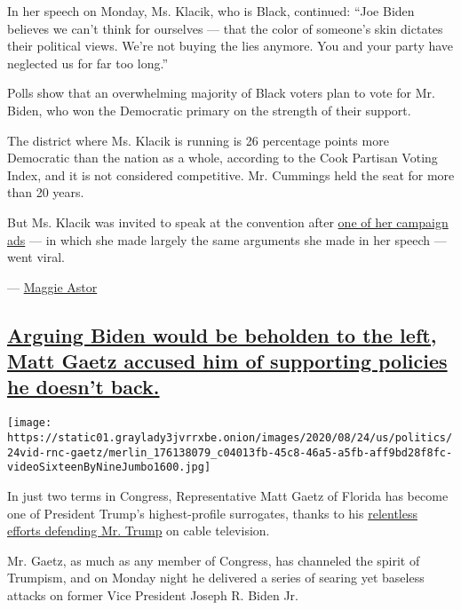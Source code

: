 In her speech on Monday, Ms. Klacik, who is Black, continued: ``Joe
Biden believes we can't think for ourselves --- that the color of
someone's skin dictates their political views. We're not buying the lies
anymore. You and your party have neglected us for far too long.''

Polls show that an overwhelming majority of Black voters plan to vote
for Mr. Biden, who won the Democratic primary on the strength of their
support.

The district where Ms. Klacik is running is 26 percentage points more
Democratic than the nation as a whole, according to the Cook Partisan
Voting Index, and it is not considered competitive. Mr. Cummings held
the seat for more than 20 years.

But Ms. Klacik was invited to speak at the convention after
\href{https://twitter.com/kimKBaltimore/status/1295461903268040707}{one
of her campaign ads} --- in which she made largely the same arguments
she made in her speech --- went viral.

--- \href{https://www.nytimes3xbfgragh.onion/by/maggie-astor}{Maggie
Astor}

\hypertarget{arguing-biden-would-be-beholden-to-the-left-matt-gaetz-accused-him-of-supporting-policies-he-doesnt-back}{%
\subsection{\texorpdfstring{\protect\hyperlink{arguing-biden-would-be-beholden-to-the-left-matt-gaetz-accused-him-of-supporting-policies-he-doesnt-back}{Arguing
Biden would be beholden to the left, Matt Gaetz accused him of
supporting policies he doesn't
back.}}{Arguing Biden would be beholden to the left, Matt Gaetz accused him of supporting policies he doesn't back.}}\label{arguing-biden-would-be-beholden-to-the-left-matt-gaetz-accused-him-of-supporting-policies-he-doesnt-back}}

\texttt{[image: https://static01.graylady3jvrrxbe.onion/images/2020/08/24/us/politics/24vid-rnc-gaetz/merlin\_176138079\_c04013fb-45c8-46a5-a5fb-aff9bd28f8fc-videoSixteenByNineJumbo1600.jpg]}

In just two terms in Congress, Representative Matt Gaetz of Florida has
become one of President Trump's highest-profile surrogates, thanks to
his
\href{https://www.nytimes3xbfgragh.onion/2019/03/30/us/politics/matt-gaetz-trump.html}{relentless
efforts defending Mr. Trump} on cable television.

Mr. Gaetz, as much as any member of Congress, has channeled the spirit
of Trumpism, and on Monday night he delivered a series of searing yet
baseless attacks on former Vice President Joseph R. Biden Jr.

